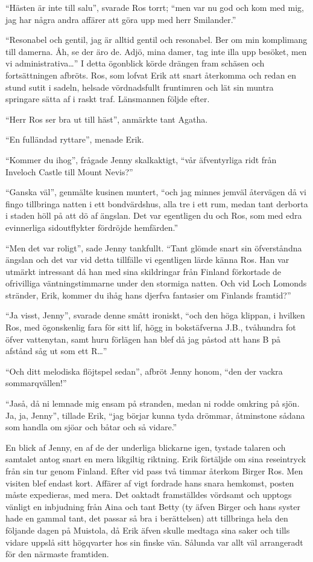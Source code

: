 ``Hästen är inte till salu'', svarade Ros torrt; ``men var nu god och
kom med mig, jag har några andra affärer att göra upp med herr
Smilander.''

``Resonabel och gentil, jag är alltid gentil och resonabel. Ber om min
komplimang till damerna. Åh, se der äro de. Adjö, mina damer, tag inte
illa upp besöket, men vi administrativa\ldots{}'' I detta ögonblick
körde drängen fram schäsen och fortsättningen afbröts. Ros, som lofvat
Erik att snart återkomma och redan en stund sutit i sadeln, helsade
vördnadsfullt fruntimren och lät sin muntra springare sätta af i raskt
traf. Länsmannen följde efter.

``Herr Ros ser bra ut till häst'', anmärkte tant Agatha.

``En fulländad ryttare'', menade Erik.

``Kommer du ihog'', frågade Jenny skalkaktigt, ``vår äfventyrliga ridt
från Inveloch Castle till Mount Nevis?''

``Ganska väl'', genmälte kusinen muntert, ``och jag minnes jemväl
återvägen då vi fingo tillbringa natten i ett bondvärdshus, alla tre i
ett rum, medan tant derborta i staden höll på att dö af ängslan. Det var
egentligen du och Ros, som med edra evinnerliga sidoutflykter fördröjde
hemfärden.''

``Men det var roligt'', sade Jenny tankfullt. ``Tant glömde snart sin
öfverståndna ängslan och det var vid detta tillfälle vi egentligen lärde
känna Ros. Han var utmärkt intressant då han med sina skildringar från
Finland förkortade de ofrivilliga väntningstimmarne under den stormiga
natten. Och vid Loch Lomonds stränder, Erik, kommer du ihåg hans djerfva
fantasier om Finlands framtid?''

``Ja visst, Jenny'', svarade denne smått ironiskt, ``och den höga
klippan, i hvilken Ros, med ögonskenlig fara för sitt lif, högg in
bokstäfverna J.B., tvåhundra fot öfver vattenytan, samt huru förlägen
han blef då jag påstod att hans B på afstånd såg ut som ett R\ldots{}''

``Och ditt melodiska flöjtspel sedan'', afbröt Jenny honom, ``den der
vackra sommarqvällen!''

``Jaså, då ni lemnade mig ensam på stranden, medan ni rodde omkring på
sjön. Ja, ja, Jenny'', tillade Erik, ``jag börjar kunna tyda drömmar,
åtminstone sådana som handla om sjöar och båtar och så vidare.''

En blick af Jenny, en af de der underliga blickarne igen, tystade
talaren och samtalet antog snart en mera likgiltig riktning. Erik
förtäljde om sina reseintryck från sin tur genom Finland. Efter vid pass
två timmar återkom Birger Ros. Men visiten blef endast kort. Affärer af
vigt fordrade hans snara hemkomst, posten måste expedieras, med mera.
Det oaktadt framställdes vördsamt och upptogs vänligt en inbjudning från
Aina och tant Betty (ty äfven Birger och hans syster hade en gammal
tant, det passar så bra i berättelsen) att tillbringa hela den följande
dagen på Muistola, då Erik äfven skulle medtaga sina saker och tills
vidare uppslå sitt högqvarter hos sin finske vän. Sålunda var allt väl
arrangeradt för den närmaste framtiden.

